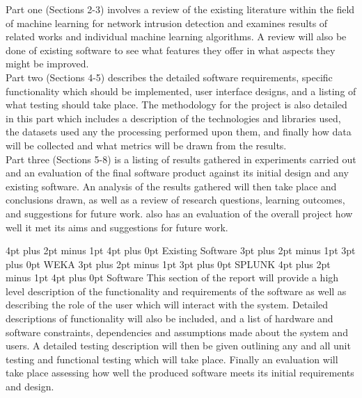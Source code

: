 \documentclass[12pt,a4paper]{article}
\makeatletter
\renewcommand\subsection{\@startsection {subsection}{1}{2mm} %
      {3pt plus 2pt minus 1pt} %
      {3pt plus 0pt} %
      {\normalfont\bfseries}}
\renewcommand\section{\@startsection {section}{1}{0mm} %
      {4pt plus 2pt minus 1pt} %
      {4pt plus 0pt} %
      {\bfseries}}
\makeatother
\begin{document}
Part one (Sections 2-3) involves a review of the existing literature within the field of machine learning for network intrusion detection and examines results of related works and individual machine learning algorithms. A review will also be done of existing software to see what features they offer in what aspects they might be improved. \\

Part two (Sections 4-5) describes the detailed software requirements, specific functionality which should be implemented, user interface designs, and a listing of what testing should take place. The methodology for the project is also detailed in this part which includes a description of the technologies and libraries used, the datasets used any the processing performed upon them, and finally how data will be collected and what metrics will be drawn from the results. \\

Part three (Sections 5-8) is a listing of results gathered in experiments carried out and an evaluation of the final software product against its initial design and any existing software. An analysis of the results gathered will then take place and conclusions drawn, as well as a review of research questions, learning outcomes, and suggestions for future work. also has an evaluation of the overall project how well it met its aims and suggestions for future work.



\section{Existing Software}
\subsection{WEKA}
\subsection{SPLUNK}
\section{Software}
This section of the report will provide a high level description of the functionality and requirements of the software as well as describing the role of the user which will interact with the system. Detailed descriptions of functionality will also be included, and a list of hardware and software constraints, dependencies and assumptions made about the system and users. A detailed testing description will then be given outlining any and all unit testing and functional testing which will take place. Finally an evaluation will take place assessing how well the produced software meets its initial requirements and design.
\end{document}
